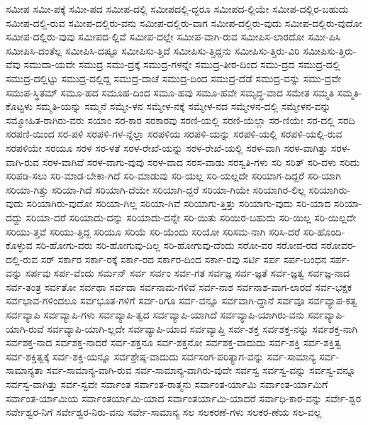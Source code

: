 {ಸಮೀಪ
ಸಮೀ-ಪಕ್ಕೆ
ಸಮೀ-ಪದ
ಸಮೀಪ-ದಲ್ಲಿ
ಸಮೀಪದಲ್ಲಿ-ದ್ದರೂ
ಸಮೀಪದ-ಲ್ಲಿಯೇ
ಸಮೀಪ-ದಲ್ಲಿರ-ಬಹುದು
ಸಮೀಪ-ದಲ್ಲಿ-ರುವ
ಸಮೀಪ-ದಲ್ಲಿರು-ವನು
ಸಮೀಪ-ದಲ್ಲಿರು-ವಾಗ
ಸಮೀಪ-ದಲ್ಲಿರು-ವುದು
ಸಮೀಪ-ದಲ್ಲಿರು-ವುದೋ
ಸಮೀಪ-ದಲ್ಲಿರು-ವುವು
ಸಮೀಪದ-ಲ್ಲಿವೆ
ಸಮೀಪ-ದಲ್ಲೇ
ಸಮೀಪ-ವಾಗಿ-ರುವ
ಸಮೀಪಿಸ-ಲಾರದೋ
ಸಮೀ-ಪಿಸಿ
ಸಮೀಪಿಸಿ-ದಂತೆಲ್ಲ
ಸಮೀಪಿಸಿ-ದಷ್ಟೂ
ಸಮೀಪಿಸು-ತ್ತಿದೆ
ಸಮೀಪಿಸು-ತ್ತಿದ್ದನು
ಸಮೀಪಿಸು-ತ್ತಿರು-ವಿರಿ
ಸಮೀಪಿಸು-ತ್ತಿರು-ವೆವು
ಸಮುದಾ-ಯವೇ
ಸಮುದ್ರ
ಸಮು-ದ್ರಕ್ಕೆ
ಸಮುದ್ರ-ಗಳನ್ನೇ
ಸಮುದ್ರ-ತೀರ-ದಿಂದ
ಸಮು-ದ್ರದ
ಸಮುದ್ರ-ದಲ್ಲಿ
ಸಮುದ್ರ-ದಲ್ಲಿಟ್ಟು
ಸಮುದ್ರ-ದಲ್ಲಿದ್ದ
ಸಮುದ್ರ-ದಾಚೆ
ಸಮುದ್ರ-ದಿಂದ
ಸಮುದ್ರ-ದೆಡೆ
ಸಮುದ್ರ-ವನ್ನು
ಸಮು-ದ್ರವೇ
ಸಮುಪ-ಸ್ಥಿತಮ್
ಸಮೂ-ಹದ
ಸಮೂಹ-ದಿಂದ
ಸಮೂ-ಹವು
ಸಮೂ-ಹವೇ
ಸಮೃದ್ಧ-ವಾದ
ಸಮೇತ
ಸಮ್ಮತಿ
ಸಮ್ಮತಿ-ಕೊಟ್ಟಳು
ಸಮ್ಮತಿ-ಯನ್ನು
ಸಮ್ಮನೆ
ಸಮ್ಮೇ-ಳನ
ಸಮ್ಮೇಳ-ನಕ್ಕೆ
ಸಮ್ಮೇಳ-ನದ
ಸಮ್ಮೇಳನ-ದಲ್ಲಿ
ಸಮ್ಮೇಳನ-ವನ್ನು
ಸಮ್ಮೋಹಿತ-ರಾಗಿರು-ವರು
ಸಯಾಂ
ಸರ-ಕಾರ
ಸರಕಾರವು
ಸರಣಿ-ಯಲ್ಲಿ
ಸರಣಿ-ಯೆಲ್ಲಾ
ಸರ-ಣಿಯೇ
ಸರ-ದಲ್ಲಿ
ಸರದಿ
ಸರಪಣಿ-ಯಿಂದ
ಸರ-ಪಳಿ
ಸರಪಳಿ-ಗಳ-ನ್ನೆಲ್ಲಾ
ಸರಪಳಿಯ
ಸರಪಳಿ-ಯನ್ನು
ಸರಪಳಿ-ಯಲ್ಲಿ
ಸರಪಳಿ-ಯಲ್ಲಿ-ರುವ
ಸರಪಳಿಯೇ
ಸರಯೂ
ಸರಳ
ಸರ-ಳತೆ
ಸರಳ-ರೇಖೆ-ಯನ್ನು
ಸರಳ-ರೇಖೆ-ಯಲ್ಲಿ
ಸರಳ-ವಾಗಿ
ಸರಳ-ವಾಗಿತ್ತು
ಸರಳ-ವಾಗಿ-ರುವ
ಸರಳ-ವಾಗಿವೆ
ಸರಳ-ವಾಗು-ವುವು
ಸರಳ-ವಾದ
ಸರಸ-ವಾಡು
ಸರಸ್ವತಿ-ಗಳು
ಸರಿ
ಸರಿತ್
ಸರಿ-ದಳು
ಸರಿದು
ಸರಿಪಡಿ-ಸಲು
ಸರಿ-ಮಾಡ-ಬೇಕಾ-ಗಿದೆ
ಸರಿ-ಮಾಡುವು
ಸರಿ-ಯಲ್ಲ
ಸರಿ-ಯಲ್ಲದೇ
ಸರಿಯಾಗ-ದಿದ್ದರೆ
ಸರಿ-ಯಾಗಿ
ಸರಿಯಾ-ಗಿತ್ತು
ಸರಿಯಾ-ಗಿದೆ
ಸರಿಯಾಗಿ-ದೆಯೇ
ಸರಿಯಾಗಿ-ದ್ದರೆ
ಸರಿಯಾ-ಗಿಯೇ
ಸರಿಯಾಗಿರ-ಲಿಲ್ಲ
ಸರಿಯಾಗಿರು-ವುದು
ಸರಿಯಾಗಿರು-ವುದೋ
ಸರಿಯಾ-ಗಿಲ್ಲ
ಸರಿಯಾ-ಗಿವೆ
ಸರಿಯಾಗು-ತ್ತಿತ್ತು
ಸರಿಯಾಗು-ವುದು
ಸರಿ-ಯಾದ
ಸರಿಯಾ-ದದ್ದು
ಸರಿಯಾ-ದರೆ
ಸರಿಯಾದು-ದನ್ನು
ಸರಿಯಾದು-ದನ್ನೇ
ಸರಿ-ಯಿತು
ಸರಿಯಿರ-ಬಹುದು
ಸರಿ-ಯಿಲ್ಲ
ಸರಿ-ಯಿಲ್ಲದೇ
ಸರಿಯು-ತ್ತವೆ
ಸರಿಯು-ತ್ತಿದ್ದ
ಸರಿಯೂ
ಸರಿಯೆ
ಸರಿ-ಯೆಂದು
ಸರಿಯೋ
ಸರಿಸಮ-ನಾಗಿ
ಸರಿಸಿ-ದರೆ
ಸರಿ-ಹೊಂದಿ-ಕೊಳ್ಳುವ
ಸರಿ-ಹೋಗು-ವರು
ಸರಿ-ಹೋಗುವು-ದಿಲ್ಲ
ಸರಿ-ಹೋಗುವು-ದೆಂದು
ಸರೋ-ವರ
ಸರೋವ-ರದ
ಸರೋವರ-ದಲ್ಲಿ-ರುವ
ಸರ್
ಸರ್ಕಾರ
ಸರ್ಕಾ-ರಕ್ಕೆ
ಸರ್ಕಾ-ರದ
ಸರ್ಕಾರ-ದಿಂದ
ಸರ್ಕಾ-ರವು
ಸರ್ಟಿ
ಸರ್ಪ
ಸರ್ಪ-ಬಂಧನ
ಸರ್ಪ-ವನ್ನು
ಸರ್ಪವು
ಸರ್ಪ-ವೆಂದು
ಸರ್ಮನ್
ಸರ್ವ
ಸರ್ವಂ
ಸರ್ವ-ಗತ
ಸರ್ವಜ್ಞ
ಸರ್ವ-ಜ್ಞತೆ
ಸರ್ವ-ಜ್ಞತ್ವ
ಸರ್ವಜ್ಞ-ನಾದ
ಸರ್ವ-ತಂತ್ರ
ಸರ್ವತೋ
ಸರ್ವಥಾ
ಸರ್ವದಾ
ಸರ್ವನಾಮ-ಗಳಿವೆ
ಸರ್ವ-ನಾಶ
ಸರ್ವನಾಶ-ವಾಗ-ಲಾರದೆ
ಸರ್ವ-ಭಕ್ಷಕ
ಸರ್ವಭಾವ-ಗಳಿಂದಲೂ
ಸರ್ವಭೂತ-ಗಳಿಗೆ
ಸರ್ವ-ರಿಗೂ
ಸರ್ವ-ವನ್ನೂ
ಸರ್ವವಾಗಿ-ದ್ದಾನೆ
ಸರ್ವವೂ
ಸರ್ವವ್ಯಾಪ-ಕತ್ವ
ಸರ್ವವ್ಯಾಪಿ
ಸರ್ವವ್ಯಾಪಿ-ಗಳು
ಸರ್ವವ್ಯಾಪಿ-ತ್ವದ
ಸರ್ವವ್ಯಾಪಿ-ಯಾಗಿದೆ
ಸರ್ವವ್ಯಾಪಿ-ಯಾಗಿರು-ವನು
ಸರ್ವವ್ಯಾಪಿ-ಯಾಗಿ-ರುವೆ
ಸರ್ವವ್ಯಾಪಿ-ಯಾಗಿ-ಲ್ಲದೇ
ಸರ್ವವ್ಯಾಪಿ-ಯಾದ
ಸರ್ವವ್ಯಾಪ್ತಿ
ಸರ್ವ-ಶಕ್ತ
ಸರ್ವಶಕ್ತ-ನನ್ನು
ಸರ್ವಶಕ್ತ-ನಾಗಿ
ಸರ್ವಶಕ್ತ-ನಾದ
ಸರ್ವಶಕ್ತ-ನಾದರೆ
ಸರ್ವ-ಶಕ್ತನೂ
ಸರ್ವ-ಶಕ್ತನೋ
ಸರ್ವಶಕ್ತ-ವಾದುದು
ಸರ್ವ-ಶಕ್ತಿ
ಸರ್ವ-ಶಕ್ತಿತ್ವ
ಸರ್ವ-ಶಕ್ತಿತ್ವಕ್ಕೆ
ಸರ್ವ-ಶಕ್ತಿ-ಯನ್ನೂ
ಸರ್ವಶ್ರೇಷ್ಠ-ವಾದುದು
ಸರ್ವಸಂಗ-ಪರಿತ್ಯಾಗ-ವನ್ನು
ಸರ್ವ-ಸಾಮಾನ್ಯ
ಸರ್ವ-ಸಾಮಾನ್ಯತಾ
ಸರ್ವ-ಸಾಮಾನ್ಯ-ವಾಗಿ-ರುವ
ಸರ್ವ-ಸಾಮಾನ್ಯ-ವಾಗಿರು-ವುದೇ
ಸರ್ವಸ್ವ
ಸರ್ವಸ್ವ-ವನ್ನು
ಸರ್ವಸ್ವ-ವನ್ನೂ
ಸರ್ವಸ್ವ-ವಾಗಿತ್ತು
ಸರ್ವ-ಸ್ವವೇ
ಸರ್ವಾಂತ
ಸರ್ವಾಂತ-ರಾತ್ಮನು
ಸರ್ವಾಂತ-ರ್ಯಾಮಿ
ಸರ್ವಾಂತ-ರ್ಯಾಮಿಗೆ
ಸರ್ವಾಂತ-ರ್ಯಾಮಿಯ
ಸರ್ವಾಂತರ್ಯಾಮಿ-ಯಾದ
ಸರ್ವಾಂತರ್ಯಾಮಿ-ಯಾದರೆ
ಸರ್ವಾಧಿ-ಕಾರ-ವನ್ನು
ಸರ್ವೇ-ಶ್ವರ
ಸರ್ವೇಶ್ವರ-ನಿಗೆ
ಸರ್ವೇಶ್ವರ-ನಿರು-ವನು
ಸರ್ವೇ-ಸಾಮಾನ್ಯ
ಸಲ
ಸಲಕರಣೆ-ಗಳು
ಸಲಕರ-ಣೆಯ
ಸಲ-ವಲ್ಲ
}
